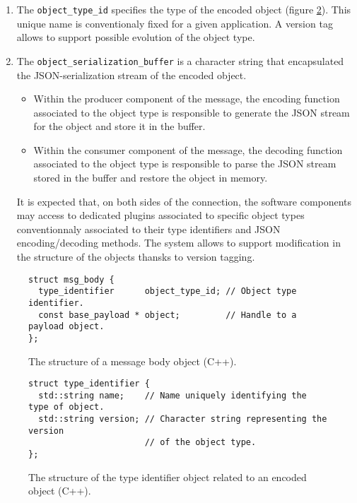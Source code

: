 \begin{enumerate}

\item The \texttt{object\_type\_id} specifies  the type of the encoded
  object  (figure \ref{fig-app-json-type_id}).   This  unique name  is
  conventionaly fixed for a given application. A version tag allows to
  support possible evolution of the object type.

\item The \texttt{object\_serialization\_buffer} is a character string
  that  encapsulated  the  JSON-serialization stream  of  the  encoded
  object.

  \begin{itemize}
  \item Within  the producer  component of  the message,  the encoding
    function associated to the object  type is responsible to generate
    the JSON stream for the object and store it in the buffer.

  \item Within  the consumer  component of  the message,  the decoding
    function associated to the object type is responsible to parse the
    JSON stream stored in the buffer and restore the object in memory.

  \end{itemize}

  It is expected  that, on both sides of the  connection, the software
  components may  access to  dedicated plugins associated  to specific
  object types conventionnaly associated to their type identifiers and
  JSON  encoding/decoding  methods.  The   system  allows  to  support
  modification  in the  structure of  the objects  thansks to  version
  tagging.

\end{enumerate}

\begin{figure}[h]
\vskip 10pt
\small
\begin{Verbatim}[frame=single,xleftmargin=0.cm,label=\fbox{C++}]
struct msg_body {
  type_identifier      object_type_id; // Object type identifier.
  const base_payload * object;         // Handle to a payload object.
};
\end{Verbatim}
\normalsize
\caption{The structure of a message body object (C++).}\label{fig-app-json-body}
\end{figure}

\begin{figure}[h]
\vskip 10pt
\small
\begin{Verbatim}[frame=single,xleftmargin=0.cm,label=\fbox{C++}]
struct type_identifier {
  std::string name;    // Name uniquely identifying the type of object.
  std::string version; // Character string representing the version
                       // of the object type.
};
\end{Verbatim}
\normalsize
\caption{The structure  of the  type identifier  object related  to an
  encoded object (C++).}\label{fig-app-json-type_id}
\end{figure}


